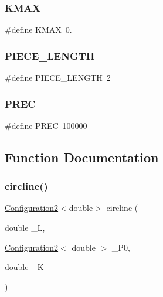 \subsubsection{\texorpdfstring{KMAX}{KMAX}}
{\footnotesize\ttfamily \#define K\+M\+AX~0.}

\mbox{\label{dubins_8hh_a5b2500ca93a5100f73dc442d3cfea7d4}} 
\subsubsection{\texorpdfstring{PIECE\_LENGTH}{PIECE\_LENGTH}}
{\footnotesize\ttfamily \#define P\+I\+E\+C\+E\+\_\+\+L\+E\+N\+G\+TH~2}

\mbox{\label{dubins_8hh_a2bda1a81ce3474772a8a1f165e54516e}} 
\subsubsection{\texorpdfstring{PREC}{PREC}}
{\footnotesize\ttfamily \#define P\+R\+EC~100000}



\subsection{Function Documentation}
\mbox{\label{dubins_8hh_adef8b363044d7fed558e5b47d8d6a3a0}} 
\subsubsection{\texorpdfstring{circline()}{circline()}}
{\footnotesize\ttfamily \mbox{\hyperlink{class_configuration2}{Configuration2}}$<$double$>$ circline (\begin{DoxyParamCaption}\item[{double}]{\+\_\+L,  }\item[{\mbox{\hyperlink{class_configuration2}{Configuration2}}$<$ double $>$}]{\+\_\+\+P0,  }\item[{double}]{\+\_\+K }\end{DoxyParamCaption})}

